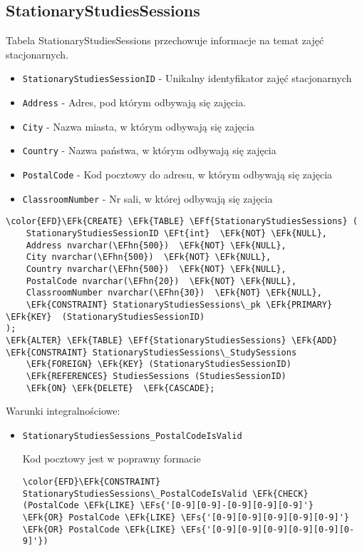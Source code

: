 \documentclass[11pt]{article}
\newcommand{\EFs}[1]{\textcolor{EFs}{#1}} %
\newcommand{\EFk}[1]{\textcolor{EFk}{\textbf{#1}}} %
\newcommand{\EFf}[1]{\textcolor{EFf}{#1}} %
\newcommand{\EFt}[1]{\textcolor{EFt}{\textbf{#1}}} %
\newcommand{\EFhn}[1]{\textcolor{EFhn}{#1}} %
\begin{document}
\subsection{StationaryStudiesSessions}
\label{sec:orge6baa47}
Tabela StationaryStudiesSessions przechowuje informacje na temat zajęć stacjonarnych.
\begin{itemize}
\item \texttt{StationaryStudiesSessionID} - Unikalny identyfikator zajęć stacjonarnych
\item \texttt{Address} - Adres, pod którym odbywają się zajęcia.
\item \texttt{City} - Nazwa miasta, w którym odbywają się zajęcia
\item \texttt{Country} - Nazwa państwa, w którym odbywają się zajęcia
\item \texttt{PostalCode} - Kod pocztowy do adresu, w którym odbywają się zajęcia
\item \texttt{ClassroomNumber} - Nr sali, w której odbywają się zajęcia
\end{itemize}
\begin{Code}
\begin{Verbatim}
\color{EFD}\EFk{CREATE} \EFk{TABLE} \EFf{StationaryStudiesSessions} (
    StationaryStudiesSessionID \EFt{int}  \EFk{NOT} \EFk{NULL},
    Address nvarchar(\EFhn{500})  \EFk{NOT} \EFk{NULL},
    City nvarchar(\EFhn{500})  \EFk{NOT} \EFk{NULL},
    Country nvarchar(\EFhn{500})  \EFk{NOT} \EFk{NULL},
    PostalCode nvarchar(\EFhn{20})  \EFk{NOT} \EFk{NULL},
    ClassroomNumber nvarchar(\EFhn{30})  \EFk{NOT} \EFk{NULL},
    \EFk{CONSTRAINT} StationaryStudiesSessions\_pk \EFk{PRIMARY} \EFk{KEY}  (StationaryStudiesSessionID)
);
\EFk{ALTER} \EFk{TABLE} \EFf{StationaryStudiesSessions} \EFk{ADD} \EFk{CONSTRAINT} StationaryStudiesSessions\_StudySessions
    \EFk{FOREIGN} \EFk{KEY} (StationaryStudiesSessionID)
    \EFk{REFERENCES} StudiesSessions (StudiesSessionID)
    \EFk{ON} \EFk{DELETE}  \EFk{CASCADE};
\end{Verbatim}
\end{Code}
Warunki integralnościowe:


\begin{itemize}
\item \texttt{StationaryStudiesSessions\_PostalCodeIsValid}

Kod pocztowy jest w poprawny formacie
\begin{Code}
\begin{Verbatim}
\color{EFD}\EFk{CONSTRAINT} StationaryStudiesSessions\_PostalCodeIsValid \EFk{CHECK}
(PostalCode \EFk{LIKE} \EFs{'[0-9][0-9]-[0-9][0-9][0-9]'}
\EFk{OR} PostalCode \EFk{LIKE} \EFs{'[0-9][0-9][0-9][0-9][0-9]'}
\EFk{OR} PostalCode \EFk{LIKE} \EFs{'[0-9][0-9][0-9][0-9][0-9][0-9]'})
\end{Verbatim}
\end{Code}
\end{itemize}
\end{document}
